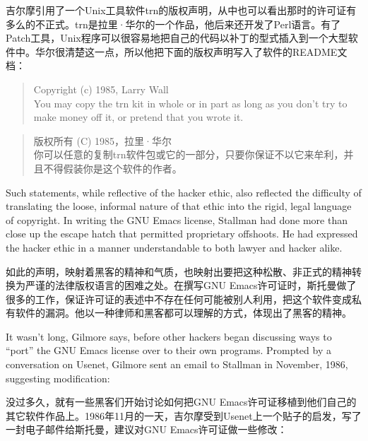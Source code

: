 \ifdefined\chs
吉尔摩引用了一个Unix工具软件trn的版权声明，从中也可以看出那时的许可证有多么的不正式。trn是拉里·华尔的一个作品，他后来还开发了Perl语言。有了Patch工具，Unix程序可以很容易地把自己的代码以补丁的型式插入到一个大型软件中。华尔很清楚这一点，所以他把下面的版权声明写入了软件的README文档：
\fi

\ifdefined\eng
\begin{quote}
Copyright (c) 1985, Larry Wall\\
You may copy the trn kit in whole or in part as long as you don't try to make money off it, or pretend that you wrote it.
\end{quote}
\fi

\ifdefined\chs
\begin{quote}
版权所有 (C) 1985，拉里·华尔\\
你可以任意的复制trn软件包或它的一部分，只要你保证不以它来牟利，并且不得假装你是这个软件的作者。
\end{quote}
\fi

\ifdefined\eng
Such statements, while reflective of the hacker ethic, also reflected the difficulty of translating the loose, informal nature of that ethic into the rigid, legal language of copyright. In writing the GNU Emacs license, Stallman had done more than close up the escape hatch that permitted proprietary offshoots. He had expressed the hacker ethic in a manner understandable to both lawyer and hacker alike.
\fi

\ifdefined\chs
如此的声明，映射着黑客的精神和气质，也映射出要把这种松散、非正式的精神转换为严谨的法律版权语言的困难之处。在撰写GNU Emacs许可证时，斯托曼做了很多的工作，保证许可证的表述中不存在任何可能被别人利用，把这个软件变成私有软件的漏洞。他以一种律师和黑客都可以理解的方式，体现出了黑客的精神。
\fi

\ifdefined\eng
It wasn't long, Gilmore says, before other hackers began discussing ways to ``port'' the GNU Emacs license over to their own programs. Prompted by a conversation on Usenet, Gilmore sent an email to Stallman in November, 1986, suggesting modification:
\fi

\ifdefined\chs
没过多久，就有一些黑客们开始讨论如何把GNU Emacs许可证移植到他们自己的其它软件作品上。1986年11月的一天，吉尔摩受到Usenet上一个贴子的启发，写了一封电子邮件给斯托曼，建议对GNU Emacs许可证做一些修改：
\fi

